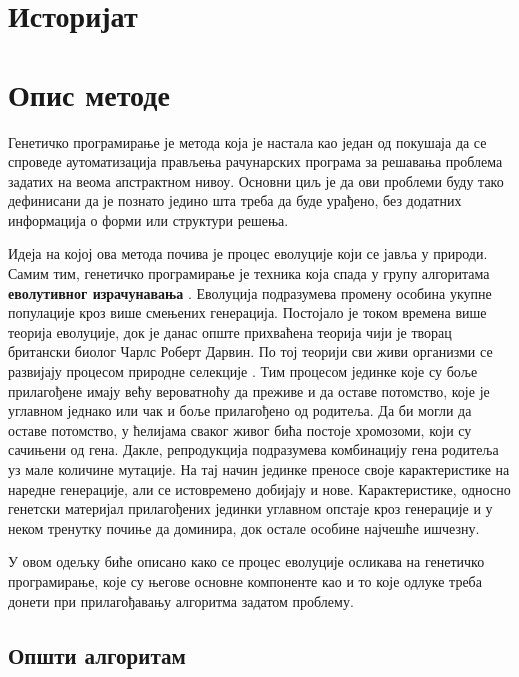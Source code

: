 \documentclass[a4paper]{article}
\begin{document}
\section{Историјат}

\section{Опис методе}

Генетичко програмирање је метода која је настала као један од покушаја да се спроведе аутоматизација прављења рачунарских програма за решавања проблема задатих на веома апстрактном нивоу. Основни циљ је да ови проблеми буду тако дефинисани да је познато једино шта треба да буде урађено, без додатних информација о форми или структури решења.\newline

Идеја на којој ова метода почива је процес еволуције који се јавља у природи. Самим тим, генетичко програмирање је техника која спада у групу алгоритама  \textbf{еволутивног израчунавања} \cite{compIntelligence}. Еволуција подразумева промену особина укупне популације кроз више смењених генерација. Постојало је током времена више теорија еволуције, док је данас опште прихваћена теорија чији је творац британски биолог Чарлс Роберт Дарвин. По тој теорији сви живи организми се развијају процесом природне селекције \cite{darwin1859}. Тим процесом јединке које су боље прилагођене имају већу вероватноћу да преживе и да оставе потомство, које је углавном једнако или чак и боље прилагођено од родитеља. Да би могли да оставе потомство, у ћелијама сваког живог бића постоје хромозоми, који су сачињени од гена. Дакле, репродукција подразумева комбинацију гена родитеља уз мале количине мутације. На тај начин јединке преносе своје карактеристике на наредне генерације, али се истовремено добијају и нове. Карактеристике, односно генетски материјал прилагођених јединки углавном опстаје кроз генерације и у неком тренутку почиње да доминира, док остале особине најчешће ишчезну.\newline

У овом одељку биће описано како се процес еволуције осликава на генетичко програмирање, које су његове основне компоненте као и то које одлуке треба донети при прилагођавању алгоритма задатом проблему.

\subsection{Општи алгоритам}
\end{document}
